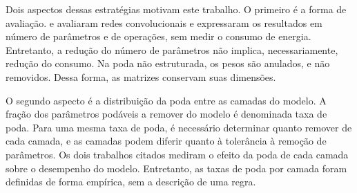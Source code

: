 Dois aspectos dessas estratégias motivam este trabalho. O primeiro é a forma de avaliação.
 e  avaliaram redes convolucionais e expressaram os
resultados em número de parâmetros e de operações, sem medir o consumo de energia.
Entretanto, a redução do número de parâmetros
não implica, necessariamente, redução do consumo. Na poda não estruturada, os pesos são
anulados, e não removidos. Dessa forma, as matrizes conservam suas dimensões.

O segundo aspecto é a distribuição da poda entre as camadas do modelo. A fração dos parâmetros
podáveis a remover do modelo é denominada taxa de poda. Para uma mesma taxa de poda, é
necessário determinar quanto remover de cada camada, e as camadas podem diferir quanto à
tolerância à remoção de parâmetros. Os dois trabalhos citados mediram o efeito da poda de cada
camada sobre o desempenho do modelo. Entretanto, as taxas de poda por camada foram definidas de
forma empírica, sem a descrição de uma regra.

